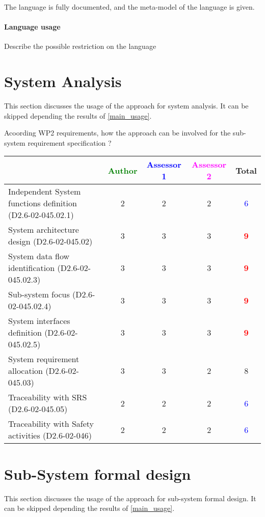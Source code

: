 The language is fully documented, and the meta-model of the language
is given.
\paragraph{Language usage} Describe the possible restriction on the language

\section{System Analysis}
This section discusses the usage of the approach for system analysis.
It can be skipped depending the results of \ref{main_usage}.

Acoording WP2 requirements, how the approach can be involved for the sub-system requirement specification ?

\begin{tabular}{|l | c | c | c | c|}
\hline
& \textcolor{green}{Author} & \textcolor{blue}{Assessor 1} & \textcolor{magenta}{Assessor 2} & Total \\
\hline
Independent System functions definition (D2.6-02-045.02.1)  &2 &2 & 2   & \textcolor{blue}{6} \\
\hline 
System architecture design (D2.6-02-045.02) &3 &3 & 3   & \textcolor{red}{\textbf{9}} \\
\hline
System data flow identification (D2.6-02-045.02.3)  &3 &3 & 3   & \textcolor{red}{\textbf{9}} \\
\hline
Sub-system focus (D2.6-02-045.02.4)  &3 &3 & 3   & \textcolor{red}{\textbf{9}} \\
\hline
System interfaces definition (D2.6-02-045.02.5)  &3 &3 & 3   & \textcolor{red}{\textbf{9}} \\
\hline
System requirement allocation (D2.6-02-045.03)  &3 &3 & 2   &  8 \\
\hline
Traceability with SRS (D2.6-02-045.05)  &2 &2 & 2   & \textcolor{blue}{6}  \\
\hline
Traceability with Safety activities (D2.6-02-046)  &2 &2 & 2    & \textcolor{blue}{6}   \\
\hline
\end{tabular}



\section{Sub-System formal design}
This section discusses the usage of the approach for sub-system formal design.
It can be skipped depending the results of \ref{main_usage}.

